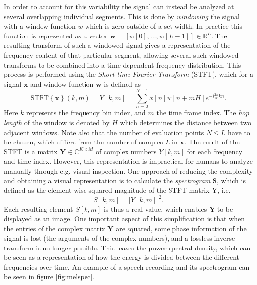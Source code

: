 \documentclass{article}
\begin{document}
In order to account for this variability the signal can instead be analyzed at several overlapping individual segments. This is done by \textit{windowing} the signal with a window function $w$ which is zero outside of a set width. In practice this function is represented as a vector $\bm{w}=[w[0],\dots, w[L-1]] \in \mathbb{R}^L$. The resulting transform of such a windowed signal gives a representation of the frequency content of that particular segment, allowing several such windowed transforms to be combined into a time-dependent frequency distribution. This process is performed using the \textit{Short-time Fourier Transform} (STFT), which for a signal $\bm{x}$ and window function $\bm{w}$ is defined as
\begin{equation}
    \text{STFT}\left\{ \bm{x} \right\}(k, m) = Y[k, m] = \sum_{n=0}^{N-1} x[n]w[n+mH]e^{-i \frac{2\pi}{N}k n}.
\end{equation}
Here $k$ represents the frequency bin index, and $m$ the time frame index. The \textit{hop length} of the window is denoted by $H$ which determines the distance between two adjacent windows. Note also that the number of evaluation points $N \leq L$ have to be chosen, which differs from the number of samples $L$ in $\bm{x}$. The result of the STFT is a matrix $\bm{Y} \in \mathbb{C}^{K \times M}$ of complex numbers $Y[k, m]$ for each frequency and time index. However, this representation is impractical for humans to analyze manually through e.g. visual inspection. One approach of reducing the complexity and obtaining a visual representation is to calculate the \textit{spectrogram} $\bm{S}$, which is defined as the element-wise squared magnitude of the STFT matrix $\bm{Y}$, i.e.
\begin{equation}
    S[k, m] = \left| Y[k, m] \right|^2.
\end{equation}
Each resulting element $S[k, m]$ is thus a real value, which enables $\bm{Y}$ to be displayed as an image. One important aspect of this simplification is that when the entries of the complex matrix $\bm{Y}$ are squared, some phase information of the signal is lost (the arguments of the complex numbers), and a lossless inverse transform is no longer possible. This leaves the power spectral density, which can be seen as a representation of how the energy is divided between the different frequencies over time. An example of a speech recording and its spectrogram can be seen in figure \ref{fig:melspec}.
\end{document}
